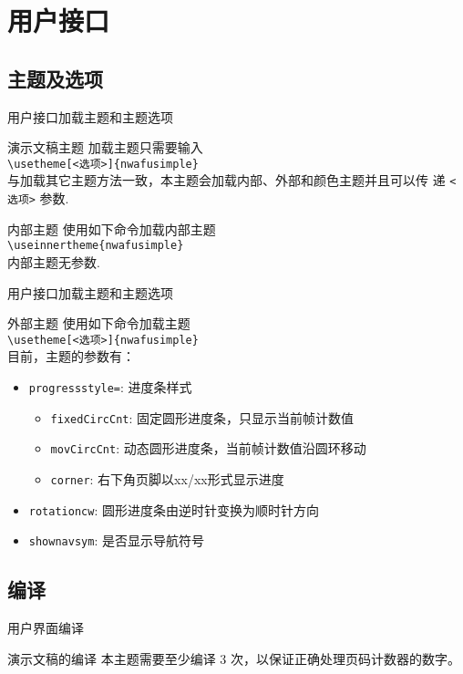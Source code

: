 \documentclass[xcolor=svgnames, t, aspectratio=169]{ctexbeamer}
\begin{document}
\section{用户接口}
\subsection{主题及选项}
\begin{frame}{用户接口}{加载主题和主题选项}
  \begin{block}{演示文稿主题}
    加载主题只需要输入\\
    {\tt \textbackslash usetheme[<选项>]\{nwafusimple\}}\\
    与加载其它主题方法一致，本主题会加载内部、外部和颜色主题并且可以传
    递 {\tt <选项>} 参数.
  \end{block}
  \begin{block}{内部主题}
    使用如下命令加载内部主题\\
    {\tt \textbackslash useinnertheme\{nwafusimple\}}\\
    内部主题无参数.
  \end{block}
\end{frame}

\begin{frame}{用户接口}{加载主题和主题选项}
  \begin{block}{外部主题}
    使用如下命令加载主题\\
    {\tt \textbackslash usetheme[<选项>]\{nwafusimple\}}\\
    目前，主题的参数有：
    \begin{itemize}
      \scriptsize
    \item {\tt progressstyle=}: 进度条样式
      \begin{itemize}
      \item {\tt fixedCircCnt}: 固定圆形进度条，只显示当前帧计数值
      \item {\tt movCircCnt}: 动态圆形进度条，当前帧计数值沿圆环移动
      \item {\tt corner}: 右下角页脚以xx/xx形式显示进度
      \end{itemize}
    \item {\tt rotationcw}: 圆形进度条由逆时针变换为顺时针方向
    \item {\tt shownavsym}: 是否显示导航符号
    \end{itemize}
  \end{block}
\end{frame}
\subsection{编译}
\begin{frame}{用户界面}{编译}
  \begin{block}{演示文稿的编译}
    本主题需要至少编译 \alert{3} 次，以保证正确处理页码计数器的数字。
  \end{block}
\end{frame}
\end{document}
